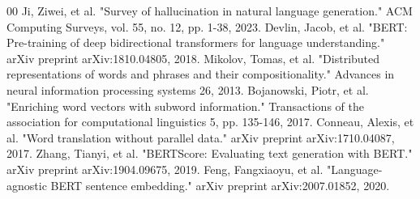 \documentclass[conference]{IEEEtran}
\begin{document}
\begin{thebibliography}{00}
 Ji, Ziwei, et al. "Survey of hallucination in natural language generation." ACM Computing Surveys, vol. 55, no. 12, pp. 1-38, 2023.
 Devlin, Jacob, et al. "BERT: Pre-training of deep bidirectional transformers for language understanding." arXiv preprint arXiv:1810.04805, 2018.
 Mikolov, Tomas, et al. "Distributed representations of words and phrases and their compositionality." Advances in neural information processing systems 26, 2013.
 Bojanowski, Piotr, et al. "Enriching word vectors with subword information." Transactions of the association for computational linguistics 5, pp. 135-146, 2017.
 Conneau, Alexis, et al. "Word translation without parallel data." arXiv preprint arXiv:1710.04087, 2017.
 Zhang, Tianyi, et al. "BERTScore: Evaluating text generation with BERT." arXiv preprint arXiv:1904.09675, 2019.
 Feng, Fangxiaoyu, et al. "Language-agnostic BERT sentence embedding." arXiv preprint arXiv:2007.01852, 2020.
\end{thebibliography}
\end{document}
